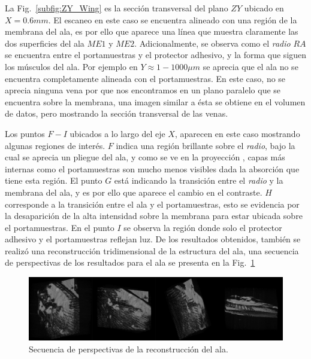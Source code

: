 La Fig.~\ref{subfig:ZY_Wing} es la sección transversal del plano $ZY$ ubicado en $X=0.6mm$. El escaneo en este caso se encuentra alineado con una región de la membrana del ala, es por ello que aparece una línea que muestra claramente las dos superficies del ala $ME1$ y $ME2$. Adicionalmente, se observa como el \emph{radio} $RA$ se encuentra entre el portamuestras y el protector adhesivo, y la forma que siguen los músculos del ala. Por ejemplo en $Y\approx 1-1000\mu m$ se aprecia que el ala no se encuentra completamente alineada con el portamuestras. En este caso, no se aprecia ninguna vena por que nos encontramos en un plano paralelo que se encuentra sobre la membrana, una imagen similar a ésta se obtiene en el volumen de datos, pero mostrando la sección transversal de las venas.

Los puntos $F-I$ ubicados a lo largo del eje $X$, aparecen en este caso mostrando algunas regiones de interés. $F$ indica una región brillante sobre el \emph{radio}, bajo la cual se aprecia un pliegue del ala, y como se ve en la proyección \enface, capas más internas como el portamuestras son mucho menos visibles dada la absorción que tiene esta región. El punto $G$ está indicando la transición entre el \emph{radio} y la membrana del ala, y es por ello que aparece el cambio en el contraste. $H$ corresponde a la transición entre el ala y el portamuestras, esto se evidencia por la desaparición de la alta intensidad sobre la membrana para estar ubicada sobre el portamuestras. En el punto $I$ se observa la región donde solo el protector adhesivo y el portamuestras reflejan luz.
De los resultados obtenidos, también se realizó una reconstrucción tridimensional de la estructura del ala, una secuencia de perspectivas de los resultados para el ala se presenta en la Fig.~\ref{fig:perspectivaswing}

\begin{figure}[!h]
	\centering
	\includegraphics[width=1\linewidth]{img/chap2/Perspectivas_wing}
	\caption[Perspectivas del ala de \textit{blattodea}.]{Secuencia de perspectivas de la reconstrucción del ala.}
	\label{fig:perspectivaswing}
\end{figure}



